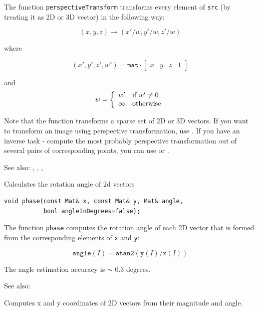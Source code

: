 The function \texttt{perspectiveTransform} transforms every element of \texttt{src} (by treating it as 2D or 3D vector) in the following way:

\[ (x, y, z) \rightarrow (x'/w, y'/w, z'/w) \]

where

\[
(x', y', z', w') = \texttt{mat} \cdot
\begin{bmatrix} x & y & z & 1 \end{bmatrix}
\]

and
\[ w = \left\{ \begin{array}{l l} w' & \mbox{if $w' \ne 0$}\\ \infty & \mbox{otherwise}\\ \end{array} \right. \]

Note that the function transforms a sparse set of 2D or 3D vectors. If you want to transform an image using perspective transformation, use . If you have an inverse task - compute the most probably perspective transformation out of several pairs of corresponding points, you can use  or .

See also: , , , 

\label{phase}
Calculates the rotation angle of 2d vectors

\begin{lstlisting}
void phase(const Mat& x, const Mat& y, Mat& angle,
           bool angleInDegrees=false);
\end{lstlisting}
\begin{description}
\end{description}

The function \texttt{phase} computes the rotation angle of each 2D vector that is formed from the corresponding elements of \texttt{x} and \texttt{y}:

\[\texttt{angle}(I) = \texttt{atan2}(\texttt{y}(I)/\texttt{x}(I))\]

The angle estimation accuracy is $\sim$ 0.3 degrees.

See also:

\label{polarToCart}
Computes x and y coordinates of 2D vectors from their magnitude and angle.

